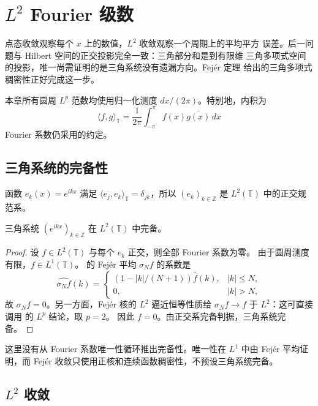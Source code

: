\chapter{\texorpdfstring{\(L^2\)}{L2} Fourier 级数}
\label{chap:l2-fourier-series}

点态收敛观察每个 \(x\) 上的数值，\(L^2\) 收敛观察一个周期上的平均平方
误差。后一问题与 Hilbert 空间的正交投影完全一致：三角部分和是到有限维
三角多项式空间的投影，唯一尚需证明的是三角系统没有遗漏方向。Fejér 定理
给出的三角多项式稠密性正好完成这一步。

本章所有圆周 \(L^p\) 范数均使用归一化测度 \(dx/(2\pi)\)。特别地，内积为
\[
 \langle f,g\rangle_{\mathbb T}
 =\frac1{2\pi}\int_{-\pi}^{\pi}f(x)\overline{g(x)}\,dx
\]
Fourier 系数仍采用的约定。

\section{三角系统的完备性}

函数 \(e_k(x)=e^{ikx}\) 满足
\(\langle e_j,e_k\rangle_{\mathbb T}=\delta_{jk}\)，所以
\((e_k)_{k\in\mathbb Z}\) 是 \(L^2(\mathbb T)\) 中的正交规范系。

\begin{theorem}\label{thm:trigonometric-system-complete}
三角系统 \((e^{ikx})_{k\in\mathbb Z}\) 在 \(L^2(\mathbb T)\) 中完备。
\end{theorem}
\begin{proof}
设 \(f\in L^2(\mathbb T)\) 与每个 \(e_k\) 正交，则全部 Fourier 系数为零。
由于圆周测度有限，\(f\in L^1(\mathbb T)\)。
的 Fejér 平均
\(\sigma_Nf\) 的系数是
\[
 \widehat{\sigma_Nf}(k)=
 \begin{cases}
 (1-|k|/(N+1))\widehat f(k),&|k|\le N,\\
 0,&|k|>N,
 \end{cases}
\]
故 \(\sigma_Nf=0\)。另一方面，Fejér 核的 \(L^2\) 逼近恒等性质给
\(\sigma_Nf\to f\) 于 \(L^2\)：这可直接调用
的 \(L^p\) 结论，取 \(p=2\)。
因此 \(f=0\)。由正交系完备判据，三角系统完备。
\end{proof}

这里没有从 Fourier 系数唯一性循环推出完备性。唯一性在 \(L^1\) 中由 Fejér
平均证明，而 Fejér 收敛只使用正核和连续函数稠密性，不预设三角系统完备。

\section{\texorpdfstring{\(L^2\)}{L2} 收敛}

